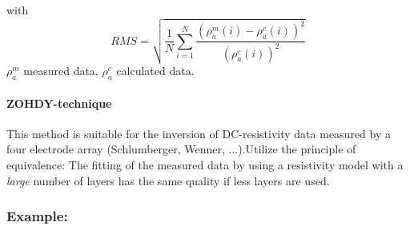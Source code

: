 with
\begin{equation}
RMS=\sqrt{\frac{1}{N}\sum_{i=1}^{N}\frac{(\rho_a^m(i)-\rho_a^c(i))^2}{(\rho_a^c(i))^2}}
\end{equation}
$\rho_a^m$ measured data, $\rho_a^c$ calculated data.

\paragraph{ZOHDY-technique}
This method is suitable for the inversion of DC-resistivity data measured by a four electrode array (Schlumberger, Wenner, ...).Utilize the principle of equivalence: The fitting of the measured data by using a resistivity model with a \textit{large} number of layers has the same quality if less layers are used.

\subsubsection*{Example:}
